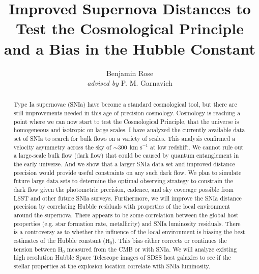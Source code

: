\documentclass[apj, iop]{emulateapj}
\newcommand{\sn}{SNIa}
\newcommand{\Hubble}{\ensuremath{\text{H}_0}}
\newcommand{\kms}{\ensuremath{~\text{km s}^{-1}}}
\begin{document}
\title{Improved Supernova Distances to Test the Cosmological Principle \\and a Bias in the Hubble Constant}

\author{Benjamin Rose \\{\it advised by} P. M. Garnavich}



\begin{abstract} 

Type Ia supernovae (\sn{}) have become a standard cosmological tool, but there
are still improvements needed in this age of precision cosmology.  Cosmology  is
reaching a point where we can now start to test the Cosmological Principle, that
the universe is homogeneous and isotropic on large scales. I have analyzed the
currently available data set of \sn{} to search for bulk flows on a variety of
scales. This analysis confirmed a velocity asymmetry across the sky of $\sim 300~\kms{}$ at
low redshift. We cannot rule out a large-scale bulk flow (dark flow) that could
be caused by quantum entanglement in the early universe. And we show that a
larger \sn{} data set and improved distance precision would provide useful
constraints on any such dark flow. We plan to simulate future large data sets to
determine the optimal observing strategy to constrain the dark flow given the
photometric precision, cadence, and sky coverage possible from LSST and other
future \sn{} surveys.  Furthermore, we will improve the \sn{} distance precision
by correlating Hubble residuals with properties of the local environment around
the supernova. There appears to be some correlation between the global host
properties (e.g. star formation rate, metallicity) and \sn{} luminosity
residuals. There is a controversy as to whether the influence of the local
environment is biasing the best estimates of the Hubble constant (\Hubble{}).
This bias either corrects or continues the tension between \Hubble{} measured
from the CMB or with \sn{}. We will analyze existing high resolution Hubble
Space Telescope images of SDSS host galaxies to see if the stellar properties at
the explosion location correlate with \sn{} luminosity.

\end{abstract}
\end{document}
